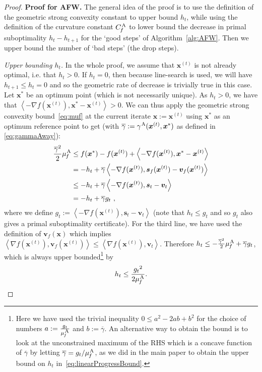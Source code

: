 \documentclass{article} %
\newcommand{\stepsize}{\gamma}
\newcommand{\away}{{\hspace{0.06em}\textnormal{\scriptsize A}}}
\newcommand{\CfAFW}{C_{\hspace{-0.08em}f}^\away}
\newcommand{\strongConvAFW}{\mu_{\hspace{-0.08em}f}^\away}
\newcommand{\x}{\bm{x}}
\newcommand{\s}{\bm{s}}
\newcommand{\vv}{\bm{v}} %
\newcommand{\innerProd}[2]{\left\langle #1 , #2 \right\rangle}
\newcommand{\0}{\mathbf{0}} %
\begin{document}
\begin{proof}
\textbf{Proof for AFW.} 
The general idea of the proof is to use the definition of the geometric
strong convexity constant to upper bound $h_t$, while using the definition of
the curvature constant $\CfAFW$ to lower bound the decrease in primal
suboptimality $h_t - h_{t+1}$ for the `good steps' of
Algorithm~\ref{alg:AFW}. Then we upper bound the number of `bad steps' (the
drop steps).

\emph{Upper bounding $h_t$.} In the whole proof, we assume that $\x^{(t)}$ is
not already optimal, i.e. that $h_t > 0$. If $h_t = 0$, then because
line-search is used, we will have $h_{t+1} \leq h_t = 0$ and so the geometric
rate of decrease is trivially true in this case.
%
%
%
Let $\x^*$ be an optimum point (which is not
necessarily unique). As $h_t > 0$, we have that $\innerProd{-\nabla
f(\x^{(t)})}{\x^*-\x^{(t)}} > 0$. We can thus apply the geometric strong
convexity bound~\eqref{eq:muf} at the current iterate $\x:=\x^{(t)}$ using
$\x^*$ as an optimum reference point to get (with $\overline{\stepsize} :=
\stepsize^\away(\x^{(t)}, \x^*)$ as defined in \eqref{eq:gammaAway}):
\begin{align}
\frac{{\overline{\stepsize}}^2}{2} \strongConvAFW  &\leq
f(\x^*)-f(\x^{(t)}) +\left\langle -\nabla f(\x^{(t)}) , \x^*-\x^{(t)} \right\rangle  \label{eq:ht_bound_trick} \\
&= -h_t + \overline{\stepsize} \left\langle - \nabla f(\x^{(t)}), \s_f(\x^{(t)}) - \vv_f(\x^{(t)})\right\rangle \nonumber\\
&\le -h_t + \overline{\stepsize} \left\langle - \nabla f(\x^{(t)}), \s_t - \vv_t \right\rangle  \nonumber\\
&=  -h_t + \overline{\stepsize}  g_t \ , \nonumber
\end{align}
where we define $g_t :=  \left\langle  -\nabla f(\x^{(t)}), \s_t - \vv_t \right\rangle$ (note that $h_t \leq g_t$ and so $g_t$ also gives a primal suboptimality certificate). %
For the third line, we have used the definition of $\vv_f(\x)$ which implies $\left\langle  \nabla f(\x^{(t)}), \vv_f(\x^{(t)})\right\rangle \leq \left\langle  \nabla f(\x^{(t)}),\vv_t \right\rangle$. %
Therefore $h_t \le -\frac{{\overline{\stepsize}}^2}{2} \strongConvAFW + \overline{\stepsize} g_t$,
which is always upper bounded\footnote{%
Here we have used the trivial inequality $0 \le %
a^2-2ab+b^2$ for the choice of numbers $a:=\frac{g_t}{\strongConvAFW}$ and $b:=\overline{\stepsize}$.
An alternative way to obtain the bound is to look at the unconstrained maximum of the RHS which is 
a concave function of $\overline{\stepsize}$ by letting $\overline{\stepsize} = g_t / \strongConvAFW$,
as we did in the main paper to obtain the upper bound on $h_t$ in~\eqref{eq:linearProgressBound}.
} %
by\vspace{-2mm}
\begin{equation} \label{eq:hUpperBound}
h_t \leq  \frac{{g_t}^2}{2\strongConvAFW}.
\end{equation}


\end{proof}
\end{document}
